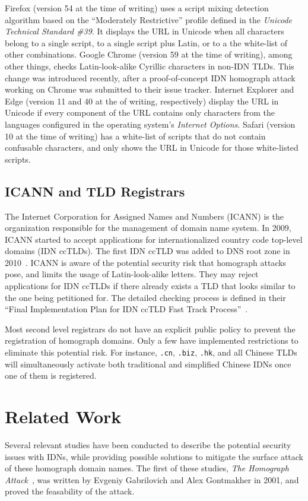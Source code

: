 \documentclass[letterpaper,twocolumn,10pt]{article}
\begin{document}
Firefox (version 54 at the time of writing) uses a script mixing detection algorithm based on the ``Moderately Restrictive'' profile defined in the \textit{Unicode Technical Standard \#39}.
It displays the URL in Unicode when all characters belong to a single script, to a single script plus Latin, or to a the white-list of other combinations.
Google Chrome (version 59 at the time of writing), among other things, checks Latin-look-alike Cyrillic characters in non-IDN TLDs.
This change was introduced recently, after a proof-of-concept IDN homograph attack working on Chrome was submitted to their issue tracker.
Internet Explorer and Edge (version 11 and 40 at the of writing, respectively) display the URL in Unicode if every component of the URL contains only characters from the languages configured in the operating system's \textit{Internet Options}.
Safari (version 10 at the time of writing) has a white-list of scripts that do not contain confusable characters, and only shows the URL in Unicode for those white-listed scripts.

\subsection{ICANN and TLD Registrars}
The Internet Corporation for Assigned Names and Numbers (ICANN) is the organization responsible for the management of domain name system.
In 2009, ICANN started to accept applications for internationalized country code top-level domains (IDN ccTLDs).
The first IDN ccTLD was added to DNS root zone in 2010~\cite{mac2010}.
ICANN is aware of the potential security risk that homograph attacks pose, and limits the usage of Latin-look-alike letters.
They may reject applications for IDN ccTLDs if there already exists a TLD that looks similar to the one being petitioned for.
The detailed checking process is defined in their ``Final Implementation Plan for IDN ccTLD Fast Track Process''~\cite{icann2013}.

Most second level registrars do not have an explicit public policy to prevent the registration of homograph domains.
Only a few have implemented restrictions to eliminate this potential risk.
For instance, \texttt{.cn}, \texttt{.biz}, \texttt{.hk}, and all Chinese TLDs will simultaneously activate both traditional and simplified Chinese IDNs once one of them is registered.

\section{Related Work}
Several relevant studies have been conducted to describe the potential security issues with IDNs, while providing possible solutions to mitigate the surface attack of these homograph domain names. The first of these studies, \textit{The Homograph Attack}~\cite{gabrilovich2002}, was written by Evgeniy Gabrilovich and Alex Gontmakher in 2001, and proved the feasability of the attack.
\end{document}
